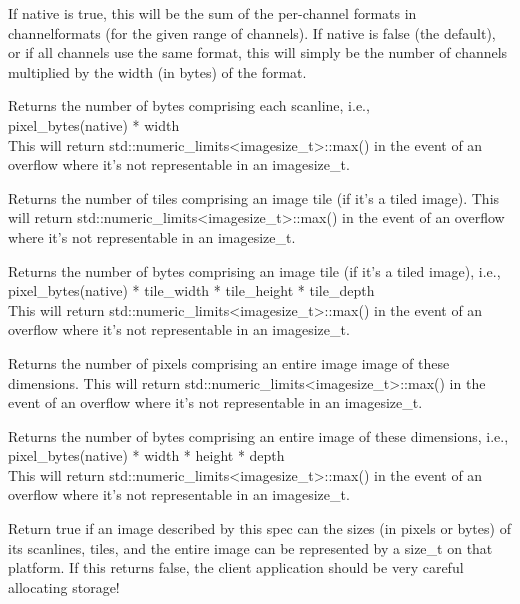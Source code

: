 If {\cf native} is true, this will be the sum of the per-channel
formats in {\cf channelformats} (for the given range of channels).  
If {\cf native} is false (the
default), or if all channels use the same format, this will simply be
the number of channels multiplied by the width (in bytes) of the {\cf format}.
\apiend

Returns the number of bytes comprising each scanline,
i.e., \\ {\cf pixel_bytes(native) * width} \\
This will return {\cf std::numeric_limits<imagesize_t>::max()} in the event
of an overflow where it's not representable in an {\cf imagesize_t}.
\apiend

Returns the number of tiles comprising an image tile (if it's a tiled image).
This will return {\cf std::numeric_limits<imagesize_t>::max()} in the event
of an overflow where it's not representable in an {\cf imagesize_t}.
\apiend

Returns the number of bytes comprising an image tile (if it's a tiled
image), i.e., \\ {\cf pixel_bytes(native) * tile_width * tile_height * tile_depth } \\
This will return {\cf std::numeric_limits<imagesize_t>::max()} in the event
of an overflow where it's not representable in an {\cf imagesize_t}.
\apiend

Returns the number of pixels comprising an entire image image of these dimensions.
This will return {\cf std::numeric_limits<imagesize_t>::max()} in the event
of an overflow where it's not representable in an {\cf imagesize_t}.
\apiend

Returns the number of bytes comprising an entire image of these
dimensions, i.e., \\
{\cf pixel_bytes(native) * width * height * depth } \\
This will return {\cf std::numeric_limits<imagesize_t>::max()} in the event
of an overflow where it's not representable in an {\cf imagesize_t}.
\apiend

Return {\cf true} if an image described by this spec can the sizes
(in pixels or bytes) of its scanlines, tiles, and the entire image can
be represented by a {\cf size_t} on that platform.  If this returns
{\cf false}, the client application should be very careful allocating
storage!
\apiend


